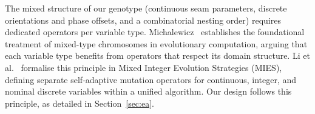 The mixed structure of our genotype (continuous seam parameters, discrete
orientations and phase offsets, and a combinatorial nesting order) requires
dedicated operators per variable type.
Michalewicz~\cite{Michalewicz1996} establishes the foundational treatment
of mixed-type chromosomes in evolutionary computation, arguing that each
variable type benefits from operators that respect its domain structure.
Li et al.~\cite{LiEEBSDR13} formalise this principle in Mixed Integer
Evolution Strategies (MIES), defining separate self-adaptive mutation
operators for continuous, integer, and nominal discrete variables within
a unified algorithm.
Our design follows this principle, as detailed in Section~\ref{sec:ea}.
